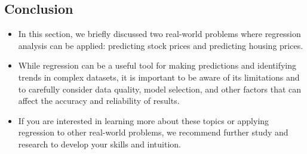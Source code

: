 \documentclass{article}
\begin{document}
\begin{enumerate}[label=\alph*)]
\subsection*{Conclusion}
\begin{itemize}
    \item In this section, we briefly discussed two real-world problems where regression analysis can be applied: predicting stock prices and predicting housing prices.
    \item While regression can be a useful tool for making predictions and identifying trends in complex datasets, it is important to be aware of its limitations and to carefully consider data quality, model selection, and other factors that can affect the accuracy and reliability of results.
    \item If you are interested in learning more about these topics or applying regression to other real-world problems, we recommend further study and research to develop your skills and intuition.
\end{itemize}
\end{enumerate}
\end{document}

